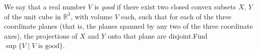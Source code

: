 \documentclass{article}
\begin{document}
\setlength{\parindent}{0pt}
We say that a real number \(\displaystyle V\) is \emph{good} if there exist two closed convex subsets \(\displaystyle X\), \(\displaystyle Y\) of the unit cube in \(\displaystyle \mathbb{R}^3\), with volume \(\displaystyle V\) each, such that for each of the three coordinate planes (that is, the planes spanned by any two of the three coordinate axes), the projections of \(\displaystyle X\) and \(\displaystyle Y\) onto that plane are disjoint.\newline Find \(\displaystyle \sup\{V\mid V \text{ is good}\}\).
\end{document}

